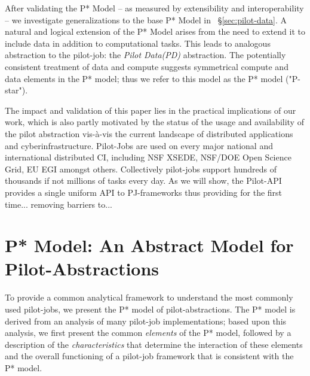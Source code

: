 \documentclass[conference,final]{IEEEtran}
\newcommand{\alnote}[1]{ {\textcolor{blue} { ***andreL: #1 }}}
\newcommand{\alnote}[1]{}
\newcommand{\pilotdata}{Pilot Data\xspace}
\newcommand{\upp}{\vspace*{-0.5em}}
\begin{document}
After validating the P* Model -- as measured by extensibility and
interoperability -- we investigate generalizations to the base P* Model
in \ \S\ref{sec:pilot-data}.  A natural and logical extension of the
P* Model arises from the need to extend it to include data in
addition to computational tasks.  This leads to analogous abstraction
to the pilot-job: the \emph{\pilotdata (PD)} abstraction.  The
potentially consistent treatment of data and compute suggests
symmetrical compute and data elements in the P* model; thus we refer
to this model as the P* model ("P-star").

The impact and validation of this paper lies in the practical
implications of our work, which is also partly motivated by the
status of the usage and availability of the pilot abstraction
vis-\`{a}-vis the current landscape of distributed applications and
cyberinfrastructure.  Pilot-Jobs are used on every major national and
international distributed CI, including NSF XSEDE, NSF/DOE Open
Science Grid, EU EGI amongst others. Collectively pilot-jobs support
hundreds of thousands if not millions of tasks every day.  As we will
show, the Pilot-API provides a single uniform API to PJ-frameworks
thus providing for the first time... removing barriers to...
 


\section{P* Model: An Abstract Model for Pilot-Abstractions\upp\upp}
\label{sec:pilot-model}

To provide a common analytical framework to understand the most
commonly used pilot-jobs, we present the P* model of
pilot-abstractions. The P* model is derived from an analysis of many
pilot-job implementations; based upon this analysis, we first present
the common {\it elements} of the P* model, followed by a description
of the {\it characteristics} that determine the interaction of these
elements and the overall functioning of a pilot-job framework that is
consistent with the P* model.


 
\end{document}
